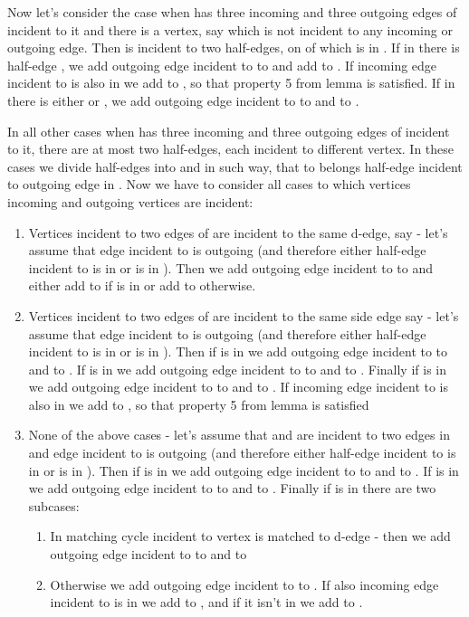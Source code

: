 \documentclass[a4, 11pt]{article}
\newcommand{\<}{\langle}
\renewcommand{\>}{\rangle}
\begin{document}
Now let's consider the case when  has three incoming and three outgoing edges of  incident to it and there is a vertex, say  which is not incident to any incoming or outgoing edge. Then  is incident to two half-edges, on of which is in . If in  there is half-edge , we add outgoing edge incident to  to  and add  to . If incoming edge incident to  is also in  we add  to , so that property 5 from lemma is satisfied. If in  there is either  or , we add outgoing edge incident to  to  and  to .

In all other cases when  has three incoming and three outgoing edges of  incident to it, there are at most two half-edges, each incident to different vertex. In these cases we divide half-edges into  and  in such way, that to  belongs half-edge incident to outgoing edge in . Now we have to consider all cases to which vertices incoming and outgoing vertices are incident:
\begin{enumerate}
	\item Vertices incident to two edges of  are incident to the same d-edge, say  - let's assume that edge incident to  is outgoing (and therefore either half-edge incident to  is in  or  is in ). Then we add outgoing edge incident to  to  and either add  to  if  is in  or add  to  otherwise.
	\item Vertices incident to two edges of  are incident to the same side edge say  - let's assume that edge incident to  is outgoing (and therefore either half-edge incident to  is in  or  is in ). Then if  is in  we add outgoing edge incident to  to  and  to . If  is in  we add outgoing edge incident to  to  and  to . Finally if  is in  we add outgoing edge incident to  to  and  to . If incoming edge incident to  is also in  we add  to , so that property 5 from lemma is satisfied
	\item None of the above cases - let's assume that  and  are incident to two edges in  and edge incident to  is outgoing (and therefore either half-edge incident to  is in  or  is in ). Then if  is in  we add outgoing edge incident to  to  and  to . If  is in  we add outgoing edge incident to  to  and  to . Finally if  is in  there are two subcases:
		\begin{enumerate}
			\item In matching  cycle incident to vertex  is matched to d-edge  - then we add outgoing edge incident to  to  and  to 
			\item Otherwise we add outgoing edge incident to  to . If also incoming edge incident to  is in  we add  to , and if it isn't in  we add  to .
		\end{enumerate}
\end{enumerate}
 
\end{document}
